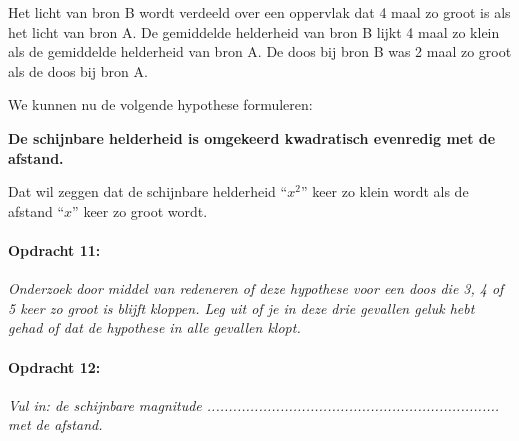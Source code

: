 Het licht van bron B wordt verdeeld over een oppervlak dat 4 maal
zo groot is als het licht van bron A. De gemiddelde helderheid van
bron B lijkt 4 maal zo klein als de gemiddelde helderheid van bron
A. De doos bij bron B was 2 maal zo groot als de doos bij bron A.

We kunnen nu de volgende hypothese formuleren:

\textbf{De schijnbare helderheid is omgekeerd kwadratisch evenredig
met de afstand.}

Dat wil zeggen dat de schijnbare helderheid ``$x^{2}$'' keer zo
klein wordt als de afstand ``$x$'' keer zo groot wordt.


\paragraph*{Opdracht 11: }

\emph{Onderzoek door middel van redeneren of deze hypothese voor een
doos die 3, 4 of 5 keer zo groot is blijft kloppen. Leg uit of je
in deze drie gevallen geluk hebt gehad of dat de hypothese in alle
gevallen klopt.}


\paragraph*{Opdracht 12:}

\emph{Vul in: de schijnbare magnitude ....................................................................
met de afstand.}


